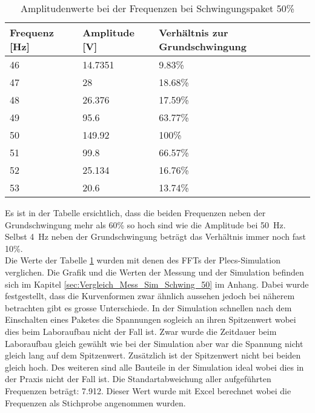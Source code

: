 \newpage
\begin{table}[ht!]
	\centering
	\begin{tabular}{|l|l|l|}
		\hline
		Frequenz {[}Hz{]} & Amplitude {[}V{]} & Verhältnis zur Grundschwingung \\ \hline
		46                & 14.7351           & 9.83\%                         \\ \hline
		47                & 28                & 18.68\%                        \\ \hline
		48                & 26.376            & 17.59\%                        \\ \hline
		49                & 95.6              & 63.77\%                        \\ \hline
		50                & 149.92            & 100\%                          \\ \hline
		51                & 99.8              & 66.57\%                        \\ \hline
		52                & 25.134            & 16.76\%                        \\ \hline
		53                & 20.6              & 13.74\%                        \\ \hline
	\end{tabular}
\caption{Amplitudenwerte bei der Frequenzen bei Schwingungspaket 50\%}\label{tab:Mess_Spannung_Schwing_50}
\end{table}

Es ist in der Tabelle ersichtlich, dass die beiden Frequenzen neben der Grundschwingung mehr als 60\% so hoch sind wie die Amplitude bei \SI{50}{Hz}. Selbst \SI{4}{Hz} neben der Grundschwingung beträgt das Verhältnis immer noch fast 10\%.\\

Die Werte der Tabelle \ref{tab:Mess_Spannung_Schwing_50} wurden mit denen des FFTs der Plecs-Simulation verglichen. Die Grafik und die Werten der Messung und der Simulation befinden sich im Kapitel \ref{sec:Vergleich_Mess_Sim_Schwing_50} im Anhang. Dabei wurde festgestellt, dass die Kurvenformen zwar ähnlich aussehen jedoch bei näherem betrachten gibt es grosse Unterschiede. In der Simulation schnellen nach dem Einschalten eines Paketes die Spannungen sogleich an ihren Spitzenwert wobei dies beim Laboraufbau nicht der Fall ist. 
Zwar wurde die Zeitdauer beim Laboraufbau gleich gewählt wie bei der Simulation aber war die Spannung nicht gleich lang auf dem Spitzenwert. Zusätzlich ist der Spitzenwert nicht bei beiden gleich hoch. Des weiteren sind alle Bauteile in der Simulation ideal wobei dies in der Praxis nicht der Fall ist. Die Standartabweichung aller aufgeführten Frequenzen beträgt: 7.912. Dieser Wert wurde mit Excel berechnet wobei die Frequenzen als Stichprobe angenommen wurden.



